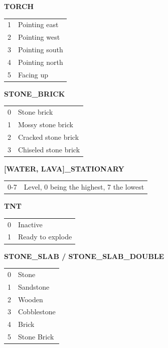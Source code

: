 \documentclass[twocolumn]{geocraft-worksheet-multipage}
\begin{document}
\textbf{TORCH}\vspace{-0.3cm}
\begin{center}
\begin{supertabular} { | r | l | }
1 & Pointing east \\
2 & Pointing west \\
3 & Pointing south \\
4 & Pointing north \\
5 & Facing up \\
\end{supertabular}
\end{center}

\textbf{STONE\_BRICK}\vspace{-0.3cm}
\begin{center}
\begin{supertabular} { | r | l | }
0 & Stone brick \\
1 & Mossy stone brick \\
2 & Cracked stone brick \\
3 & Chiseled stone brick \\
\end{supertabular}
\end{center}\vspace{-0.2cm}

\textbf{[WATER, LAVA]\_STATIONARY}\vspace{-0.3cm}

\begin{center}
\begin{supertabular} { | r | l | }
0-7 & Level, 0 being the highest, 7 the lowest \\
\end{supertabular}
\end{center}


\textbf{TNT}\vspace{-0.3cm}
\begin{center}
\begin{supertabular} { | r | l | }
0 & Inactive \\
1 & Ready to explode \\
\end{supertabular}
\end{center} 

\vfill\eject

\textbf{STONE\_SLAB / STONE\_SLAB\_DOUBLE}
\begin{center}
\begin{supertabular} { | r | l | }
0 & Stone \\
1 & Sandstone \\
2 & Wooden \\
3 & Cobblestone \\
4 & Brick \\
5 & Stone Brick \\
\end{supertabular}
\end{center}
\end{document}
